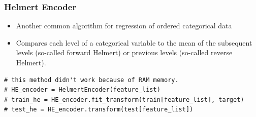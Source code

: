 \documentclass{beamer}
\begin{document}
    \begin{frame}[fragile]
        \frametitle{Helmert Encoder}
        \begin{itemize}
            \item Another common algorithm for regression of ordered categorical data
            \pause
            \item Compares each level of a categorical variable to the mean of the subsequent
            levels (so-called forward Helmert) or previous levels (so-called reverse Helmert).
            \pause
        \end{itemize}

        \begin{lstlisting}
# this method didn't work because of RAM memory.
# HE_encoder = HelmertEncoder(feature_list)
# train_he = HE_encoder.fit_transform(train[feature_list], target)
# test_he = HE_encoder.transform(test[feature_list])
        \end{lstlisting}
    \end{frame}
\end{document}
